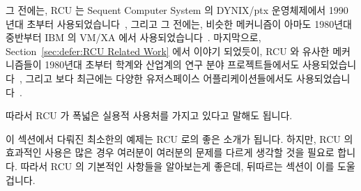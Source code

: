 그 전에는,  RCU 는 Sequent Computer System 의 DYNIX/ptx 운영체제에서 1990년대
초부터 사용되었습니다~\cite{McKenney98}, 그리고 그 전에는, 비슷한 메커니즘이
아마도 1980년대 중반부터 IBM 의 VM/XA 에서 사용되었습니다~\cite{Hennessy89}.
마지막으로,
Section~\ref{sec:defer:RCU Related Work} 에서 이야기 되었듯이, RCU 와 유사한
메커니즘들이 1980년대 초부터 학계와 산업계의 연구 분야 프로젝트들에서도
사용되었습니다~\cite{Kung80}, 그리고 보다 최근에는 다양한 유저스페이스
어플리케이션들에서도
사용되었습니다~\cite{MathieuDesnoyers2009URCU,MikeDay2013RCUqemu,GeoffRomer2018C++DeferredReclamationP0561R4}.

따라서 RCU 가 폭넓은 실용적 사용처를 가지고 있다고 말해도 됩니다.

이 섹션에서 다뤄진 최소한의 예제는 RCU 로의 좋은 소개가 됩니다.
하지만, RCU 의 효과적인 사용은 많은 경우 여러분이 여러분의 문제를 다르게 생각할
것을 필요로 합니다.
따라서 RCU 의 기본적인 사항들을 알아보는게 좋은데, 뒤따르는 섹션이 이를 도울
겁니다.

